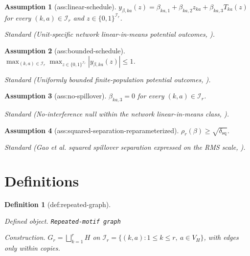 \documentclass{article}
\newtheorem{assumption}{Assumption}
\newtheorem{definition}{Definition}
\begin{document}
\begin{assumption}[ass:linear-schedule]\label{ass:linear-schedule}
\(y_{\beta,ka}(z)=\beta_{ka,1}+\beta_{ka,2}z_{ka}+\beta_{ka,3}T_{ka}(z)\) for every \((k,a)\in\mathcal I_r\) and \(z\in\{0,1\}^{\mathcal I_r}\).
\par\smallskip\noindent\emph{Standard} (Unit-specific network linear-in-means potential outcomes, \cite{GaoHarshawSavjeWang2026}).
\end{assumption}

\begin{assumption}[ass:bounded-schedule]\label{ass:bounded-schedule}
\(\max_{(k,a)\in\mathcal I_r}\max_{z\in\{0,1\}^{\mathcal I_r}}|y_{\beta,ka}(z)|\le1\).
\par\smallskip\noindent\emph{Standard} (Uniformly bounded finite-population potential outcomes, \cite{GaoHarshawSavjeWang2026}).
\end{assumption}

\begin{assumption}[ass:no-spillover]\label{ass:no-spillover}
\(\beta_{ka,3}=0\) for every \((k,a)\in\mathcal I_r\).
\par\smallskip\noindent\emph{Standard} (No-interference null within the network linear-in-means class, \cite{GaoHarshawSavjeWang2026}).
\end{assumption}

\begin{assumption}[ass:squared-separation-reparameterized]\label{ass:squared-separation-reparameterized}
\(\rho_r(\beta)\ge\sqrt{\delta_{\mathrm{sq}}}\).
\par\smallskip\noindent\emph{Standard} (Gao et al. squared spillover separation expressed on the RMS scale, \cite{GaoHarshawSavjeWang2026}).
\end{assumption}

\section{Definitions}

\begin{definition}[def:repeated-graph]\label{def:repeated-graph}
\par\smallskip\noindent\emph{Defined object.} \texttt{Repeated-\allowbreak{}motif graph}
\par\smallskip\noindent\emph{Construction.} \(G_r=\bigsqcup_{k=1}^rH\) on \(\mathcal I_r=\{(k,a):1\le k\le r,\ a\in V_H\}\), with edges only within copies.
\end{definition}
\end{document}
